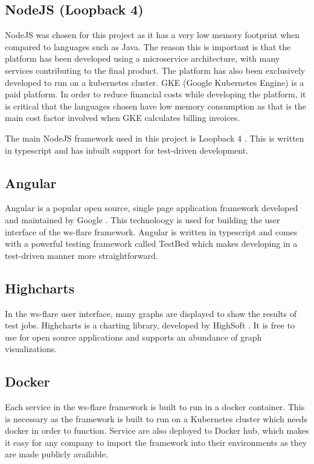 \subsection{NodeJS (Loopback 4)}

NodeJS was chosen for this project as it has a very low memory footprint when compared to languages such as Java. The reason this is important is that the platform has been developed using a microservice architecture, with many services contributing to the final product. The platform has also been exclusively developed to run on a kubernetes cluster. GKE (Google Kubernetes Engine) is a paid platform. In order to reduce financial costs while developing the platform, it is critical that the languages chosen have low memory consumption as that is the main cost factor involved when GKE calculates billing invoices.

The main NodeJS framework used in this project is Loopback 4 \cite{loopback4}. This is written in typescript and has inbuilt support for test-driven development.

\subsection{Angular}

Angular is a popular open source, single page application framework developed and maintained by Google \cite{angular}. This technoloogy is used for building the user interface of the ws-flare framework. Angular is written in typescript and comes with a powerful testing framework called TestBed which makes developing in a test-driven manner more straightforward.

\subsection{Highcharts}

In the ws-flare user interface, many graphs are displayed to show the results of test jobs. Highcharts is a charting library, developed by HighSoft \cite{highcharts}. It is free to use for open source applications and supports an abundance of graph visualizations.

\subsection{Docker}

Each service in the ws-flare framework is built to run in a docker container. This is necessary as the framework is built to run on a Kubernetes cluster which needs docker in order to function. Service are also deployed to Docker hub, which makes it easy for any company to import the framework into their environments as they are made publicly available.

